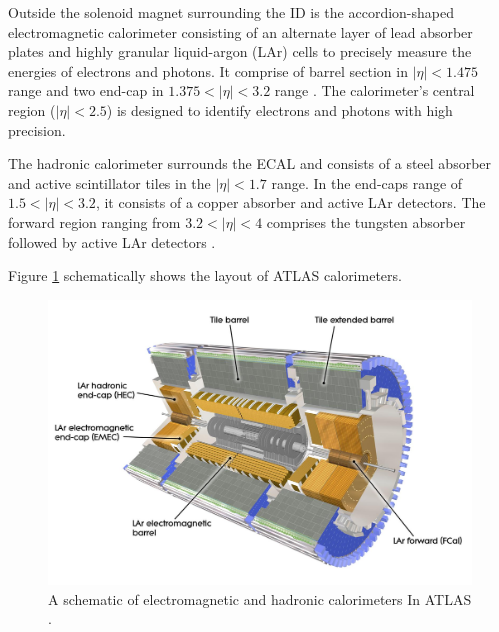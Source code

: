 Outside the solenoid magnet surrounding the ID is the accordion-shaped electromagnetic calorimeter consisting of an alternate layer of lead absorber plates and highly granular liquid-argon (LAr) cells to precisely measure the energies of electrons and photons. It comprise of barrel section in $|\eta| < 1.475$ range and two end-cap in $1.375 < |\eta| < 3.2$ range \cite{ATLAS_ECAL}. The calorimeter's central region ($|\eta| < 2.5$) is designed to identify electrons and photons with high precision.

The hadronic calorimeter surrounds the ECAL and consists of a steel absorber and active scintillator tiles in the $|\eta| < 1.7$ range. In the end-caps range of $1.5 < |\eta| < 3.2$, it consists of a copper absorber and active LAr detectors. The forward region ranging from $3.2 < |\eta| < 4$ comprises the tungsten absorber followed by active LAr detectors \cite{ATLAS_HCAL}. 

Figure \ref{fig:ATLAS_Cals} schematically shows the layout of ATLAS calorimeters. 

\begin{figure}
    \centering
    \includegraphics[width=.98\linewidth]{figures/LHC/ATLAS_CALO.jpeg}
    \caption{ A schematic of electromagnetic and hadronic calorimeters In ATLAS \cite{ATLAS}.\label{fig:ATLAS_Cals}}
\end{figure}


